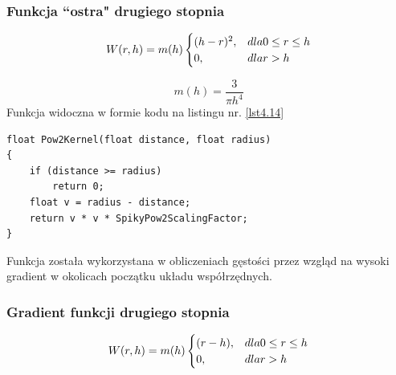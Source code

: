 \documentclass{article}
\begin{document}
\subsubsection{Funkcja ``ostra" drugiego stopnia}
\begin{equation}\label{eqn27}
W(r,h) = m(h)
\begin{cases}
(h-r)^2, & dla \space 0 \leq r \leq h\\
0, & dla \space r > h
\end{cases}
\end{equation}

\begin{center}
\newline
\caption{Rysunek 9: Funkcja ``ostra" drugiego stopnia}
\label{functions_2}
\end{center}
\newline


\begin{equation}\label{eqn28}
m(h) = \frac{3}{\pi h^4}
\end{equation}
\newline
Funkcja widoczna w formie kodu na listingu nr. \ref{lst4.14}\newline

\begin{lstlisting}[caption=Funkcja ``ostra" drugiego stopnia, label={lst4.14}]
float Pow2Kernel(float distance, float radius)
{
	if (distance >= radius)
        return 0;
	float v = radius - distance;
	return v * v * SpikyPow2ScalingFactor;
}
\end{lstlisting}
\noindent
Funkcja została wykorzystana w obliczeniach gęstości przez wzgląd na wysoki gradient w okolicach początku układu współrzędnych.\newline

\subsubsection{Gradient funkcji drugiego stopnia}
\begin{equation}\label{eqn29}
W(r,h) = m(h)
\begin{cases}
(r-h), & dla \space 0 \leq r \leq h\\
0, & dla \space r > h
\end{cases}
\end{equation}
\end{document}

